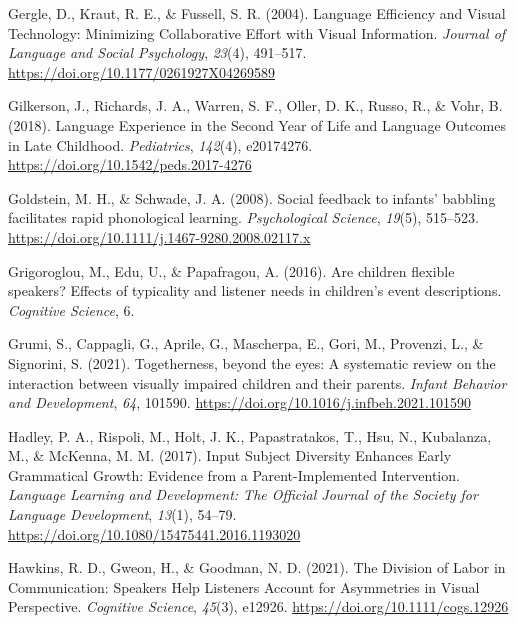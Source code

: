 \documentclass[
  man,floatsintext]{apa6}
\newlength{\cslhangindent}
\newlength{\cslentryspacingunit} %
\newenvironment{CSLReferences}[2] %
 {%
  \setlength{\parindent}{0pt}
  \ifodd #1
  \let\oldpar\par
  \def\par{\hangindent=\cslhangindent\oldpar}
  \fi
  \setlength{\parskip}{#2\cslentryspacingunit}
 }%
 {}
\begin{document}
\begin{CSLReferences}{1}{0}
\leavevmode{}%
Gergle, D., Kraut, R. E., \& Fussell, S. R. (2004). Language {Efficiency} and {Visual Technology}: {Minimizing Collaborative Effort} with {Visual Information}. \emph{Journal of Language and Social Psychology}, \emph{23}(4), 491--517. \url{https://doi.org/10.1177/0261927X04269589}

\leavevmode{}%
Gilkerson, J., Richards, J. A., Warren, S. F., Oller, D. K., Russo, R., \& Vohr, B. (2018). Language {Experience} in the {Second Year} of {Life} and {Language Outcomes} in {Late Childhood}. \emph{Pediatrics}, \emph{142}(4), e20174276. \url{https://doi.org/10.1542/peds.2017-4276}

\leavevmode{}%
Goldstein, M. H., \& Schwade, J. A. (2008). Social feedback to infants' babbling facilitates rapid phonological learning. \emph{Psychological Science}, \emph{19}(5), 515--523. \url{https://doi.org/10.1111/j.1467-9280.2008.02117.x}

\leavevmode{}%
Grigoroglou, M., Edu, U., \& Papafragou, A. (2016). Are children flexible speakers? {Effects} of typicality and listener needs in children's event descriptions. \emph{Cognitive Science}, 6.

\leavevmode{}%
Grumi, S., Cappagli, G., Aprile, G., Mascherpa, E., Gori, M., Provenzi, L., \& Signorini, S. (2021). Togetherness, beyond the eyes: {A} systematic review on the interaction between visually impaired children and their parents. \emph{Infant Behavior and Development}, \emph{64}, 101590. \url{https://doi.org/10.1016/j.infbeh.2021.101590}

\leavevmode{}%
Hadley, P. A., Rispoli, M., Holt, J. K., Papastratakos, T., Hsu, N., Kubalanza, M., \& McKenna, M. M. (2017). Input {Subject Diversity Enhances Early Grammatical Growth}: {Evidence} from a {Parent-Implemented Intervention}. \emph{Language Learning and Development: The Official Journal of the Society for Language Development}, \emph{13}(1), 54--79. \url{https://doi.org/10.1080/15475441.2016.1193020}

\leavevmode{}%
Hawkins, R. D., Gweon, H., \& Goodman, N. D. (2021). The {Division} of {Labor} in {Communication}: {Speakers Help Listeners Account} for {Asymmetries} in {Visual Perspective}. \emph{Cognitive Science}, \emph{45}(3), e12926. \url{https://doi.org/10.1111/cogs.12926}


\end{CSLReferences}
\end{document}

